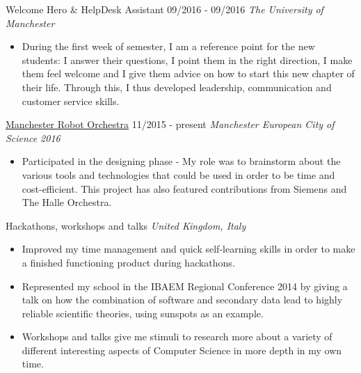 \documentclass[]{friggeri-cv}
\begin{document}
\begin{entrylist}
    {}
    {Welcome Hero \& HelpDesk Assistant}
    {09/2016 - 09/2016}
    {\emph{The University of Manchester}}
    \begin{itemize}
        \item During the first week of semester, I am a reference point for the new students: I answer their questions, I point them in the right direction, I make them feel welcome and I give them advice on how to start this new chapter of their life. Through this, I thus developed leadership, communication and customer service skills.\\
    \end{itemize}
  \entry
    {}
    {\href{http://manchestersciencecity.com/inspire/article/the-robots-are-coming/}{Manchester Robot Orchestra}}
    {11/2015 - present}
    {\emph{Manchester European City of Science 2016}}
    \begin{itemize}
        \item Participated in the designing phase - My role was to brainstorm about the various tools and technologies that could be used in order to be time and cost-efficient. This project has also featured contributions from Siemens and The Halle Orchestra.  
    \end{itemize}
  \entry
    {\null}
    {Hackathons, workshops and talks}
    {}
    {\emph{United Kingdom, Italy}}
    \begin{itemize}
        \item Improved my time management and quick self-learning skills in order to make a finished functioning product during hackathons.
        \item Represented my school in the IBAEM Regional Conference 2014 by giving a talk on how the combination of software and secondary data lead to highly reliable scientific theories, using sunspots as an example.
        \item Workshops and talks give me stimuli to research more about a variety of different interesting aspects of Computer Science in more depth in my own time.
    \end{itemize}
\end{entrylist}
\end{document}
